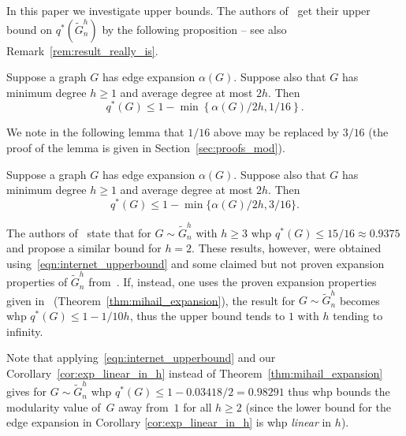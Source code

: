 \documentclass[runningheads, envcountsame, smallextended]{llncs}
\newcommand{\q}{q^*}
\numberwithin{theorem}{section}
\numberwithin{definition}{section}
\numberwithin{lemma}{section}
\numberwithin{corollary}{section}
\numberwithin{proposition}{section}
\numberwithin{conjecture}{section}
\numberwithin{remark}{section}
\numberwithin{equation}{section}
\begin{document}
In this paper we investigate upper bounds. The authors of~\cite{prokhorenkova2017modularity_internet_Math} get their upper bound on $q^*(\tilde{G}_n^h)$ by the following proposition -- see also Remark~\ref{rem:result_really_is}.

\begin{proposition} \label{prop:PPR} 	
Suppose a graph $G$ has edge expansion $\alpha(G)$. Suppose also that $G$ has minimum degree $h \geq 1$ and average degree at most $2h$. Then
\begin{equation}\label{eqn:internet_upperbound}
	\q(G) \leq 1 - \min\left\{\alpha(G)/2h, 1/16\right\}.
\end{equation}
\end{proposition}
%
We note in the following lemma that $1/16$ above may be replaced by $3/16$ (the proof of the lemma is given in Section~\ref{sec:proofs_mod}).

\begin{lemma}\label{lem:us_upper_bound} Suppose a graph $G$ has edge expansion $\alpha(G)$. 
Suppose also that $G$ has minimum degree $h \geq 1$ and average degree at most $2h$. Then
    \[	
    \q(G) \leq  1 - \min\{\alpha(G)/2h, 3/16\}. 
    \]
\end{lemma}


\begin{remark}\label{rem:result_really_is}
The authors of~\cite{prokhorenkova2017modularity_internet_Math} state that for $G \sim \tilde{G}_n^h$ with $h \geq 3$ whp $q^*(G) \leq 15/16 \approx 0.9375$ and propose a similar bound for $h=2$.
% 
These results, however, were obtained using~\eqref{eqn:internet_upperbound} and some claimed but not proven expansion properties of $\tilde{G}_n^h$ from~\cite{mihail2003conf}. If, instead, one uses the proven expansion properties given in~\cite{mihail2006journal} (Theorem~\ref{thm:mihail_expansion}), the result for $G \sim \tilde{G}_n^h$ becomes whp $q^*(G) \leq 1-1/10h$, thus the upper bound tends to $1$ with $h$ tending to infinity.

Note that applying~\eqref{eqn:internet_upperbound} and our Corollary~\ref{cor:exp_linear_in_h} instead of Theorem~\ref{thm:mihail_expansion} gives for $G \sim \tilde{G}_n^h$ whp $\q(G)\leq 1-0.03418/2 = 0.98291$ thus whp bounds the modularity value of~$G$ away from~$1$ for all $h \geq 2$ (since the lower bound for the edge expansion in Corollary \ref{cor:exp_linear_in_h} is whp \emph{linear} in $h$).
\end{remark}
\end{document}
